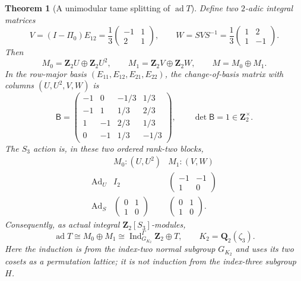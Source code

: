 \documentclass[11pt]{article}
\newtheorem{theorem}{Theorem}[section]
\theoremstyle{definition}
\begin{document}
\begin{theorem}[A unimodular tame splitting of $\operatorname{ad}T$]
\label{thm:dyadic-s3-adjoint-unimodular-splitting}
Define two $2$-adic integral matrices
\begin{equation}\label{eq:dyadic-s3-adjoint-vw-matrices}
 V=(I-\Pi_0)E_{12}
 =\frac13\begin{pmatrix}-1&1\\2&1\end{pmatrix},
 \qquad
 W=SVS^{-1}
 =\frac13\begin{pmatrix}1&2\\1&-1\end{pmatrix}.
\end{equation}
Then
\begin{equation}\label{eq:dyadic-s3-adjoint-basis}
\boxed{\quad
M_0=\mathbf Z_2 U\oplus\mathbf Z_2 U^2,
\qquad
M_1=\mathbf Z_2 V\oplus\mathbf Z_2 W,
\qquad
M=M_0\oplus M_1.
\quad}
\end{equation}
In the row-major basis
$(E_{11},E_{12},E_{21},E_{22})$,
the change-of-basis matrix with
columns $(U,U^2,V,W)$ is
\begin{equation}\label{eq:dyadic-s3-adjoint-unimodular-basis}
\mathsf B=
\begin{pmatrix}
-1&0&-1/3&1/3\\
-1&1&1/3&2/3\\
1&-1&2/3&1/3\\
0&-1&1/3&-1/3
\end{pmatrix},
\qquad
\boxed{\det\mathsf B=1\in\mathbf Z_2^\times}.
\end{equation}
The $S_3$ action is, in these
two ordered rank-two blocks,
\begin{equation}\label{eq:dyadic-s3-adjoint-s3-block-actions}
\begin{array}{c|cc}
& M_0:(U,U^2)&M_1:(V,W)\\ \hline
\operatorname{Ad}_U
&I_2&
\begin{pmatrix}-1&-1\\1&0\end{pmatrix}\\[6pt]
\operatorname{Ad}_S
&\begin{pmatrix}0&1\\1&0\end{pmatrix}&
\begin{pmatrix}0&1\\1&0\end{pmatrix}.
\end{array}
\end{equation}
Consequently, as \emph{actual
integral} $\mathbf Z_2[S_3]$-modules,
\begin{equation}\label{eq:dyadic-s3-adjoint-induced-plus-natural}
\boxed{\quad
\operatorname{ad}T
\cong M_0\oplus M_1
\cong
\operatorname{Ind}_{G_{K_2}}^\Gamma\mathbf Z_2
\oplus T,
\qquad K_2=\mathbf Q_2(\zeta_3).
\quad}
\end{equation}
Here the induction is from the
index-two normal subgroup $G_{K_2}$
and uses its two cosets as a
\emph{permutation lattice};
it is not induction from the
index-three subgroup $H$.
\end{theorem}
\end{document}
